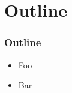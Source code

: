 \section{Outline}

\begin{frame}
\frametitle{Outline}

\begin{itemize}
  \item Foo
  \item Bar
\end{itemize}

\end{frame}

